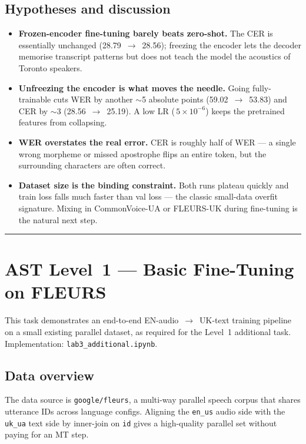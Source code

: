 \documentclass[11pt]{article}
\newcommand{\sectionrule}{\vspace{0.5em}\noindent\rule{\textwidth}{0.4pt}\vspace{0.5em}}
\begin{document}
\subsection{Hypotheses and discussion}
\begin{itemize}
    \item \textbf{Frozen-encoder fine-tuning barely beats zero-shot.}
    The CER is essentially unchanged (28.79~$\rightarrow$~28.56); freezing
    the encoder lets the decoder memorise transcript patterns but does not
    teach the model the acoustics of Toronto speakers.
    \item \textbf{Unfreezing the encoder is what moves the needle.} Going
    fully-trainable cuts WER by another $\sim$5 absolute points
    (59.02~$\rightarrow$~53.83) and CER by $\sim$3 (28.56~$\rightarrow$~25.19).
    A low LR (\,$5\!\times\!10^{-6}$) keeps the pretrained features from
    collapsing.
    \item \textbf{WER overstates the real error.} CER is roughly half of WER
    --- a single wrong morpheme or missed apostrophe flips an entire token,
    but the surrounding characters are often correct.
    \item \textbf{Dataset size is the binding constraint.} Both runs plateau
    quickly and train loss falls much faster than val loss --- the classic
    small-data overfit signature. Mixing in CommonVoice-UA or FLEURS-UK
    during fine-tuning is the natural next step.
\end{itemize}

\sectionrule

\section{AST Level~1 --- Basic Fine-Tuning on FLEURS}

This task demonstrates an end-to-end EN-audio~$\rightarrow$~UK-text training
pipeline on a small existing parallel dataset, as required for the Level~1
additional task. Implementation: \texttt{lab3\_additional.ipynb}.

\subsection{Data overview}
The data source is \texttt{google/fleurs}, a multi-way parallel speech corpus
that shares utterance IDs across language configs. Aligning the
\texttt{en\_us} audio side with the \texttt{uk\_ua} text side by inner-join on
\texttt{id} gives a high-quality parallel set without paying for an MT step.
\end{document}
